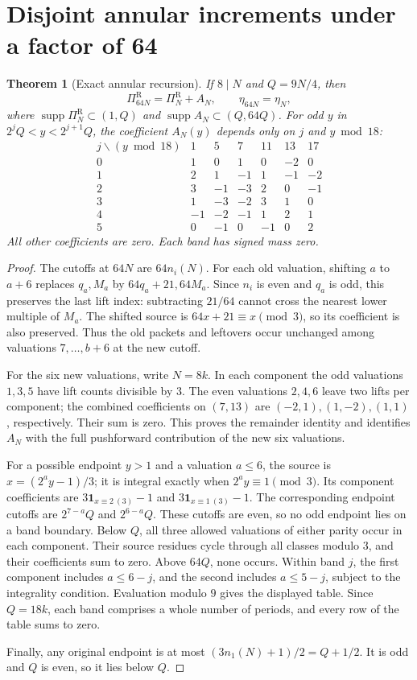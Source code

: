 \documentclass[11pt]{article}
\newtheorem{theorem}{Theorem}
\newcommand{\PiR}{\Pi^{\mathrm R}}
\newcommand{\supp}{\operatorname{supp}}
\begin{document}
\section{Disjoint annular increments under a factor of 64}
\begin{theorem}[Exact annular recursion]\label{thm:annular}
If $8\mid N$ and $Q=9N/4$, then
\[
\PiR_{64N}=\PiR_N+A_N,\qquad \eta_{64N}=\eta_N,
\]
where $\supp\PiR_N\subset(1,Q)$ and $\supp A_N\subset(Q,64Q)$.
For odd $y$ in $2^jQ<y<2^{j+1}Q$, the coefficient $A_N(y)$ depends only
on $j$ and $y\bmod18$:
\[
\begin{array}{c|rrrrrr}
j\backslash(y\bmod18)&1&5&7&11&13&17\\\hline
0&1&0&1&0&-2&0\\
1&2&1&-1&1&-1&-2\\
2&3&-1&-3&2&0&-1\\
3&1&-3&-2&3&1&0\\
4&-1&-2&-1&1&2&1\\
5&0&-1&0&-1&0&2
\end{array}
\]
All other coefficients are zero. Each band has signed mass zero.
\end{theorem}
\begin{proof}
The cutoffs at $64N$ are $64n_i(N)$. For each old valuation, shifting
$a$ to $a+6$ replaces $q_a,M_a$ by $64q_a+21,64M_a$.
Since $n_i$ is even and $q_a$ is odd, this preserves the last lift index:
subtracting $21/64$ cannot cross the nearest lower multiple of $M_a$.
The shifted source is $64x+21\equiv x\pmod3$, so its coefficient is also
preserved. Thus the old packets and leftovers occur unchanged among
valuations $7,\ldots,b+6$ at the new cutoff.

For the six new valuations, write $N=8k$. In each component the odd
valuations $1,3,5$ have lift counts divisible by $3$. The even valuations
$2,4,6$ leave two lifts per component; the combined coefficients on
$(7,13)$ are $(-2,1),(1,-2),(1,1)$, respectively. Their sum is zero.
This proves the remainder identity and identifies $A_N$ with the full
pushforward contribution of the new six valuations.

For a possible endpoint $y>1$ and a valuation $a\le6$, the source is
$x=(2^ay-1)/3$; it is integral exactly when $2^ay\equiv1\pmod3$.
Its component coefficients are
$3\mathbf1_{x\equiv2\ (3)}-1$ and
$3\mathbf1_{x\equiv1\ (3)}-1$.
The corresponding endpoint cutoffs are $2^{7-a}Q$ and $2^{6-a}Q$.
These cutoffs are even, so no odd endpoint lies on a band boundary.
Below $Q$, all three allowed valuations of either parity occur in each
component. Their source residues cycle through all classes modulo $3$,
and their coefficients sum to zero. Above $64Q$, none occurs.
Within band $j$, the first component includes $a\le6-j$, and the second
includes $a\le5-j$, subject to the integrality condition. Evaluation modulo
$9$ gives the displayed table. Since $Q=18k$, each band comprises a whole
number of periods, and every row of the table sums to zero.

Finally, any original endpoint is at most $(3n_1(N)+1)/2=Q+1/2$.
It is odd and $Q$ is even, so it lies below $Q$.
\end{proof}
\end{document}
